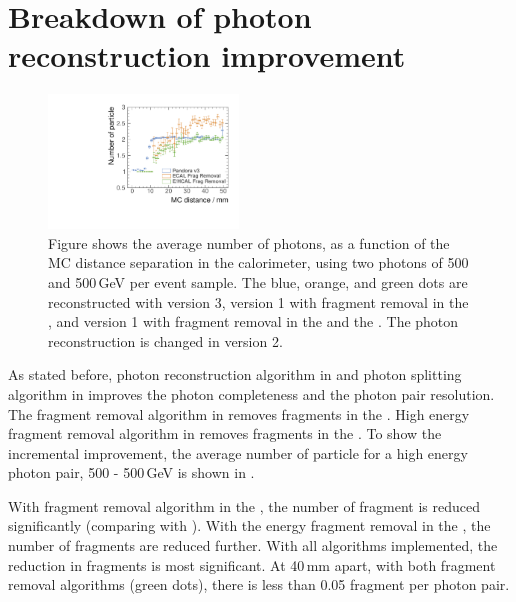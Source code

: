 \section{Breakdown of photon reconstruction improvement}



\begin{figure}[tbph]
\centering
\includegraphics[width=0.45\textwidth]{photon/DoubleCompareAlgs.pdf}
\caption[Average number of photons, as a function of the MC distance separation for different algorithms combinations.]
{Figure shows the average number of photons, as a function of the MC distance separation in the calorimeter, using two photons of 500 and 500\,GeV per event sample. The blue, orange, and green dots are reconstructed with \pandora version 3, \pandora version 1 with fragment removal in the \ECAL, and \pandora version 1 with fragment removal in the \ECAL and the \HCAL. The photon reconstruction is changed in \pandora version 2.}
\label{fig:photonDoubleCompareAlgs}
\end{figure}

As stated before, photon reconstruction algorithm in  and photon splitting algorithm in   improves the photon completeness and the photon pair resolution. The fragment removal algorithm in  removes fragments in the \ECAL. High energy fragment removal algorithm in  removes fragments in the \HCAL. To show the incremental improvement, the average number of particle for a high energy photon pair, 500 - 500\,GeV is shown in .

With fragment removal algorithm in the \ECAL, the number of fragment is reduced significantly (comparing with ). With the energy fragment removal in the \HCAL, the number of fragments are reduced further. With all algorithms implemented, the reduction in fragments is most significant. At 40\,mm apart, with both fragment removal algorithms (green dots), there is less than 0.05 fragment per photon pair.

